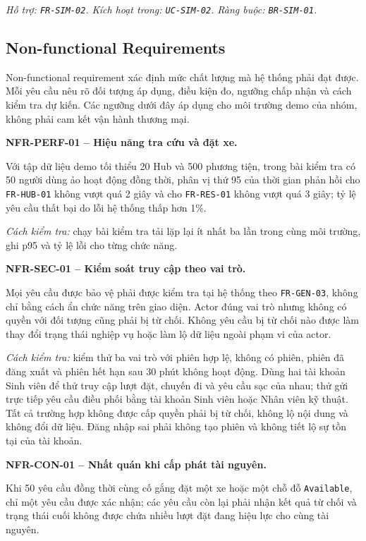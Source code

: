 \textit{Hỗ trợ: \texttt{FR-SIM-02}. Kích hoạt trong: \texttt{UC-SIM-02}. Ràng buộc: \texttt{BR-SIM-01}.}

\subsection{Non-functional Requirements}

Non-functional requirement xác định mức chất lượng mà hệ thống phải đạt được. Mỗi yêu cầu nêu rõ đối tượng áp dụng, điều kiện đo, ngưỡng chấp nhận và cách kiểm tra dự kiến. Các ngưỡng dưới đây áp dụng cho môi trường demo của nhóm, không phải cam kết vận hành thương mại.

\noindent\textbf{NFR-PERF-01 -- Hiệu năng tra cứu và đặt xe.}\par
\nopagebreak[4]
Với tập dữ liệu demo tối thiểu 20 Hub và 500 phương tiện, trong bài kiểm tra có 50 người dùng ảo hoạt động đồng thời, phân vị thứ 95 của thời gian phản hồi cho \texttt{FR-HUB-01} không vượt quá 2 giây và cho \texttt{FR-RES-01} không vượt quá 3 giây; tỷ lệ yêu cầu thất bại do lỗi hệ thống thấp hơn 1\%.

\textit{Cách kiểm tra:} chạy bài kiểm tra tải lặp lại ít nhất ba lần trong cùng môi trường, ghi p95 và tỷ lệ lỗi cho từng chức năng.

\medskip
\noindent\textbf{NFR-SEC-01 -- Kiểm soát truy cập theo vai trò.}\par
\nopagebreak[4]
Mọi yêu cầu được bảo vệ phải được kiểm tra tại hệ thống theo \texttt{FR-GEN-03}, không chỉ bằng cách ẩn chức năng trên giao diện. Actor đúng vai trò nhưng không có quyền với đối tượng cũng phải bị từ chối. Không yêu cầu bị từ chối nào được làm thay đổi trạng thái nghiệp vụ hoặc làm lộ dữ liệu ngoài phạm vi của actor.

\textit{Cách kiểm tra:} kiểm thử ba vai trò với phiên hợp lệ, không có phiên, phiên đã đăng xuất và phiên hết hạn sau 30 phút không hoạt động. Dùng hai tài khoản Sinh viên để thử truy cập lượt đặt, chuyến đi và yêu cầu sạc của nhau; thử gửi trực tiếp yêu cầu điều phối bằng tài khoản Sinh viên hoặc Nhân viên kỹ thuật. Tất cả trường hợp không được cấp quyền phải bị từ chối, không lộ nội dung và không đổi dữ liệu. Đăng nhập sai phải không tạo phiên và không tiết lộ sự tồn tại của tài khoản.

\medskip
\noindent\textbf{NFR-CON-01 -- Nhất quán khi cấp phát tài nguyên.}\par
\nopagebreak[4]
Khi 50 yêu cầu đồng thời cùng cố gắng đặt một xe hoặc một chỗ đỗ \texttt{Available}, chỉ một yêu cầu được xác nhận; các yêu cầu còn lại phải nhận kết quả từ chối và trạng thái cuối không được chứa nhiều lượt đặt đang hiệu lực cho cùng tài nguyên.

